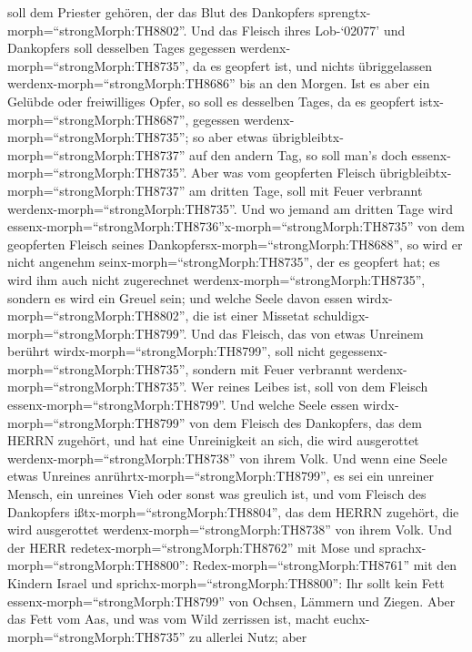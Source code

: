 soll dem Priester gehören, der das Blut des Dankopfers
sprengtx-morph=``strongMorph:TH8802''.  Und das Fleisch
ihres Lob-`02077' und Dankopfers soll desselben Tages gegessen
werdenx-morph=``strongMorph:TH8735'', da es geopfert ist, und nichts
übriggelassen werdenx-morph=``strongMorph:TH8686'' bis an den Morgen.
 Ist es aber ein Gelübde oder freiwilliges Opfer, so soll
es desselben Tages, da es geopfert istx-morph=``strongMorph:TH8687'',
gegessen werdenx-morph=``strongMorph:TH8735''; so aber etwas
übrigbleibtx-morph=``strongMorph:TH8737'' auf den andern Tag, so soll
man's doch essenx-morph=``strongMorph:TH8735''.  Aber was
vom geopferten Fleisch übrigbleibtx-morph=``strongMorph:TH8737'' am
dritten Tage, soll mit Feuer verbrannt
werdenx-morph=``strongMorph:TH8735''.  Und wo jemand am
dritten Tage wird
essenx-morph=``strongMorph:TH8736''x-morph=``strongMorph:TH8735'' von
dem geopferten Fleisch seines Dankopfersx-morph=``strongMorph:TH8688'',
so wird er nicht angenehm seinx-morph=``strongMorph:TH8735'', der es
geopfert hat; es wird ihm auch nicht zugerechnet
werdenx-morph=``strongMorph:TH8735'', sondern es wird ein Greuel sein;
und welche Seele davon essen wirdx-morph=``strongMorph:TH8802'', die ist
einer Missetat schuldigx-morph=``strongMorph:TH8799''.  Und
das Fleisch, das von etwas Unreinem berührt
wirdx-morph=``strongMorph:TH8799'', soll nicht
gegessenx-morph=``strongMorph:TH8735'', sondern mit Feuer verbrannt
werdenx-morph=``strongMorph:TH8735''. Wer reines Leibes ist, soll von
dem Fleisch essenx-morph=``strongMorph:TH8799''.  Und
welche Seele essen wirdx-morph=``strongMorph:TH8799'' von dem Fleisch
des Dankopfers, das dem HERRN zugehört, und hat eine Unreinigkeit an
sich, die wird ausgerottet werdenx-morph=``strongMorph:TH8738'' von
ihrem Volk.  Und wenn eine Seele etwas Unreines
anrührtx-morph=``strongMorph:TH8799'', es sei ein unreiner Mensch, ein
unreines Vieh oder sonst was greulich ist, und vom Fleisch des
Dankopfers ißtx-morph=``strongMorph:TH8804'', das dem HERRN zugehört,
die wird ausgerottet werdenx-morph=``strongMorph:TH8738'' von ihrem
Volk.  Und der HERR redetex-morph=``strongMorph:TH8762''
mit Mose und sprachx-morph=``strongMorph:TH8800'': 
Redex-morph=``strongMorph:TH8761'' mit den Kindern Israel und
sprichx-morph=``strongMorph:TH8800'': Ihr sollt kein Fett
essenx-morph=``strongMorph:TH8799'' von Ochsen, Lämmern und Ziegen.
 Aber das Fett vom Aas, und was vom Wild zerrissen ist,
macht euchx-morph=``strongMorph:TH8735'' zu allerlei Nutz; aber
